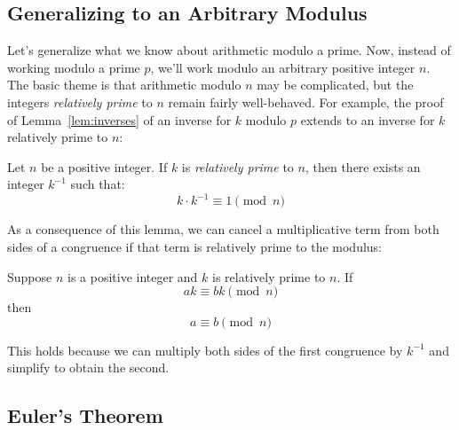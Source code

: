 \iffalse
are all those of the form
$mp$.  For $mp$ to be in the interval, $m$ can take any value from 0 to
$p^{k-1}-1$ and no others, so there are exactly $p^{k-1}$ numbers in the
interval that are divisible by $p$.  Now $\phi(p^{k})$ equals the number
of remaining elements in the interval, namely, $p^k -p^{k-1}$.
\fi


\subsection{Generalizing to an Arbitrary Modulus}

Let's generalize what we know about arithmetic modulo a prime.  Now,
instead of working modulo a prime $p$, we'll work modulo an arbitrary
positive integer $n$.  The basic theme is that arithmetic modulo $n$ may
be complicated, but the integers {\em relatively prime} to $n$ remain
fairly well-behaved.  For example, the proof of Lemma~\ref{lem:inverses}
of an inverse for $k$ modulo $p$ extends to an inverse for $k$ relatively
prime to $n$:

\begin{lemma}
\label{lem:inverse-arb}
Let $n$ be a positive integer.  If $k$ is \emph{relatively prime} to
$n$, then there exists an integer $k^{-1}$ such that:
%
\[
k \cdot k^{-1} \equiv 1 \pmod{n}
\]
\end{lemma}


\iffalse
\begin{proof}
There exist integers $s$ and $t$ such that $s k + t n = \gcd(k, n) =
1$ by Theorem~\ref{th:gcd}.  Rearranging terms gives $tn = 1 - sk$,
which implies that $n \divides 1 - sk$ and $sk \equiv 1 \pmod{n}$.  Define
$k^{-1}$ to be $s$.
\end{proof}
\fi

As a consequence of this lemma, we can cancel a multiplicative term
from both sides of a congruence if that term is relatively prime to
the modulus:

\begin{corollary}
\label{cor:cancellation-arb}
Suppose $n$ is a positive integer and $k$ is relatively prime to $n$.
If
%
\[
a k \equiv b k \pmod{n}
\]
%
then
%
\[
a \equiv b \pmod{n}
\]
\end{corollary}

This holds because we can multiply both sides of the first congruence
by $k^{-1}$ and simplify to obtain the second.

\subsection{Euler's Theorem}

